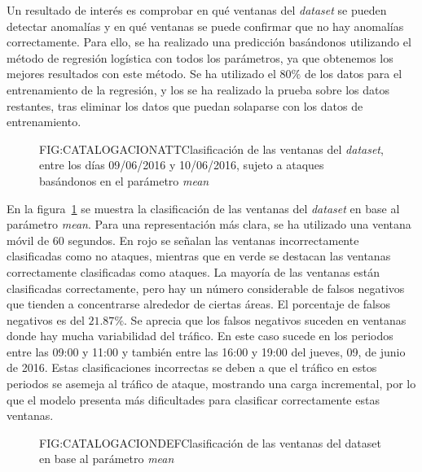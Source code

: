 Un resultado de interés es comprobar en qué ventanas del \textit{dataset} se pueden detectar anomalías y en qué ventanas se puede confirmar que no hay anomalías correctamente. Para ello, se ha realizado una predicción basándonos utilizando el método de regresión logística con todos los parámetros, ya que obtenemos los mejores resultados con este método. Se ha utilizado el $80\%$ de los datos para el entrenamiento de la regresión, y los se ha realizado la prueba sobre los datos restantes, tras eliminar los datos que puedan solaparse con los datos de entrenamiento.

\begin{figure}[Clasificación de las ventanas del \textit{dataset}, entre los días 09/06/2016 y 10/06/2016, sujeto a ataques en base al parámetro \textit{mean}]{FIG:CATALOGACIONATT}{Clasificación de las ventanas del \textit{dataset}, entre los días 09/06/2016 y 10/06/2016, sujeto a ataques basándonos en el parámetro \textit{mean}}
    \label{FIG:CATALOGACIONATT}
\end{figure}

En la figura~\ref{FIG:CATALOGACIONATT} se muestra la clasificación de las ventanas del \textit{dataset} en base al parámetro \textit{mean}. Para una representación más clara, se ha utilizado una ventana móvil de 60 segundos.
En rojo se señalan las ventanas incorrectamente clasificadas como no ataques, mientras que en verde se destacan las ventanas correctamente clasificadas como ataques. La mayoría de las ventanas están clasificadas correctamente, pero hay un número considerable de falsos negativos que tienden a concentrarse alrededor de ciertas áreas. El porcentaje de falsos negativos es del $21.87\%$. Se aprecia que los falsos negativos suceden en ventanas donde hay mucha variabilidad del tráfico. En este caso sucede en los periodos entre las 09:00 y 11:00 y también entre las 16:00 y 19:00 del jueves, 09, de junio de 2016. Estas clasificaciones incorrectas se deben a que el tráfico en estos periodos se asemeja al tráfico de ataque, mostrando una carga incremental, por lo que el modelo presenta más dificultades para clasificar correctamente estas ventanas.

\begin{figure}[Clasificación de las ventanas del dataset en base al parámetro \textit{mean}]{FIG:CATALOGACIONDEF}{Clasificación de las ventanas del dataset en base al parámetro \textit{mean}}
    \label{FIG:CATALOGACIONDEF}
\end{figure}

